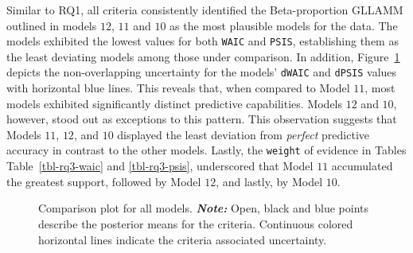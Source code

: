 \documentclass[
  authoryear,
  preprint,
  1p]{elsarticle}
\begin{document}
Similar to RQ1, all criteria consistently identified the Beta-proportion
GLLAMM outlined in models \(12\), \(11\) and \(10\) as the most
plausible models for the data. The models exhibited the lowest values
for both \texttt{WAIC} and \texttt{PSIS}, establishing them as the least
deviating models among those under comparison. In addition,
Figure~\ref{fig-rq3-waic-psis} depicts the non-overlapping uncertainty
for the models' \texttt{dWAIC} and \texttt{dPSIS} values with horizontal
blue lines. This reveals that, when compared to Model \(11\), most
models exhibited significantly distinct predictive capabilities. Models
\(12\) and \(10\), however, stood out as exceptions to this pattern.
This observation suggests that Models \(11\), \(12\), and \(10\)
displayed the least deviation from \emph{perfect} predictive accuracy in
contrast to the other models. Lastly, the \texttt{weight} of evidence in
Tables Table~\ref{tbl-rq3-waic} and \ref{tbl-rq3-psis}, underscored that
Model \(11\) accumulated the greatest support, followed by Model \(12\),
and lastly, by Model \(10\).

\label{cell-fig-rq3-waic-psis}
\begin{figure}[H]


\caption{\label{fig-rq3-waic-psis}Comparison plot for all models.
\textbf{\emph{Note:}} Open, black and blue points describe the posterior
means for the criteria. Continuous colored horizontal lines indicate the
criteria associated uncertainty.}

\end{figure}%
\end{document}
